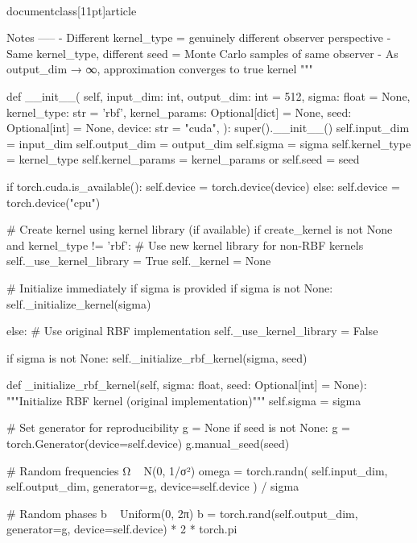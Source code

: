 \\documentclass[11pt]{article}
\begin{document}
\begin{CodeBlock}
    Notes
    -----
    - Different kernel_type = genuinely different observer perspective
    - Same kernel_type, different seed = Monte Carlo samples of same observer
    - As output_dim → ∞, approximation converges to true kernel
    """
    
    def __init__(
        self,
        input_dim: int,
        output_dim: int = 512,
        sigma: float = None,
        kernel_type: str = 'rbf',
        kernel_params: Optional[dict] = None,
        seed: Optional[int] = None,
        device: str = "cuda",
    ):
        super().__init__()
        self.input_dim = input_dim
        self.output_dim = output_dim
        self.sigma = sigma
        self.kernel_type = kernel_type
        self.kernel_params = kernel_params or {}
        self.seed = seed

        if torch.cuda.is_available():
            self.device = torch.device(device)
        else:
            self.device = torch.device("cpu")

        # Create kernel using kernel library (if available)
        if create_kernel is not None and kernel_type != 'rbf':
            # Use new kernel library for non-RBF kernels
            self._use_kernel_library = True
            self._kernel = None
            
            # Initialize immediately if sigma is provided
            if sigma is not None:
                self._initialize_kernel(sigma)
            
        else:
            # Use original RBF implementation
            self._use_kernel_library = False
            
            if sigma is not None:
                self._initialize_rbf_kernel(sigma, seed)
            
    def _initialize_rbf_kernel(self, sigma: float, seed: Optional[int] = None):
        """Initialize RBF kernel (original implementation)"""
        self.sigma = sigma
        
        # Set generator for reproducibility
        g = None
        if seed is not None:
            g = torch.Generator(device=self.device)
            g.manual_seed(seed)

        # Random frequencies Ω ~ N(0, 1/σ²)
        omega = torch.randn(
            self.input_dim, self.output_dim, generator=g, device=self.device
        ) / sigma
        
        # Random phases b ~ Uniform(0, 2π)
        b = torch.rand(self.output_dim, generator=g, device=self.device) * 2 * torch.pi


\end{CodeBlock}
\end{document}
